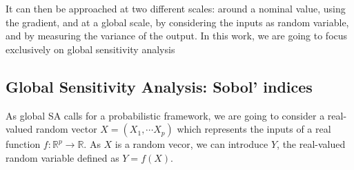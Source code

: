 \documentclass[../../Main_ManuscritThese.tex]{subfiles}
\begin{document}
It can then be approached at two different scales:
around a nominal value, using the gradient, and at a global scale, by
considering the inputs as random variable, and by measuring the
variance of the output. In this work, we are going to focus
exclusively on global sensitivity analysis

\subsection{Global Sensitivity Analysis: Sobol' indices}
\label{sec:sobol-indices}
As global SA calls for a probabilistic framework, we are going to
consider a real-valued random vector $X=(X_1,\cdots X_p)$ which
represents the inputs of a real function
$f: \mathbb{R}^p\rightarrow \mathbb{R}$.  As $X$ is a random vecor, we
can introduce $Y$, the real-valued random variable defined as
$Y=f(X)$.
\end{document}
